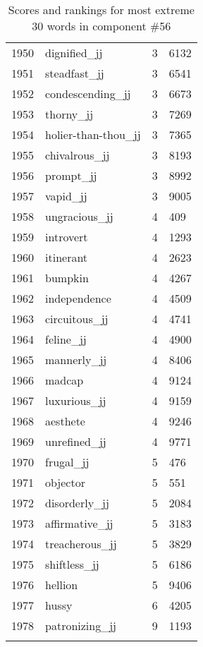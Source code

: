 \begin{longtable}[!htbp]{| rlr@{.}l |}
    1950 & dignified\_jj & 3 & 6132 \\
    1951 & steadfast\_jj & 3 & 6541 \\
    1952 & condescending\_jj & 3 & 6673 \\
    1953 & thorny\_jj & 3 & 7269 \\
    1954 & holier-than-thou\_jj & 3 & 7365 \\
    1955 & chivalrous\_jj & 3 & 8193 \\
    1956 & prompt\_jj & 3 & 8992 \\
    1957 & vapid\_jj & 3 & 9005 \\
    1958 & ungracious\_jj & 4 & 409 \\
    1959 & introvert & 4 & 1293 \\
    1960 & itinerant & 4 & 2623 \\
    1961 & bumpkin & 4 & 4267 \\
    1962 & independence & 4 & 4509 \\
    1963 & circuitous\_jj & 4 & 4741 \\
    1964 & feline\_jj & 4 & 4900 \\
    1965 & mannerly\_jj & 4 & 8406 \\
    1966 & madcap & 4 & 9124 \\
    1967 & luxurious\_jj & 4 & 9159 \\
    1968 & aesthete & 4 & 9246 \\
    1969 & unrefined\_jj & 4 & 9771 \\
    1970 & frugal\_jj & 5 & 476 \\
    1971 & objector & 5 & 551 \\
    1972 & disorderly\_jj & 5 & 2084 \\
    1973 & affirmative\_jj & 5 & 3183 \\
    1974 & treacherous\_jj & 5 & 3829 \\
    1975 & shiftless\_jj & 5 & 6186 \\
    1976 & hellion & 5 & 9406 \\
    1977 & hussy & 6 & 4205 \\
    1978 & patronizing\_jj & 9 & 1193 \\
    \hline
    \caption{Scores and rankings for most extreme 30 words in component \#56} \\
\end{longtable}
